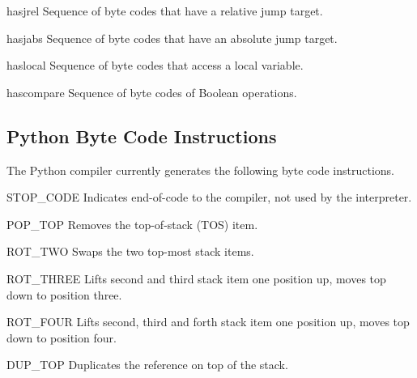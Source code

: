 \begin{datadesc}{hasjrel}
Sequence of byte codes that have a relative jump target.
\end{datadesc}

\begin{datadesc}{hasjabs}
Sequence of byte codes that have an absolute jump target.
\end{datadesc}

\begin{datadesc}{haslocal}
Sequence of byte codes that access a local variable.
\end{datadesc}

\begin{datadesc}{hascompare}
Sequence of byte codes of Boolean operations.
\end{datadesc}

\subsection{Python Byte Code Instructions}
\label{bytecodes}

The Python compiler currently generates the following byte code
instructions.


\begin{opcodedesc}{STOP_CODE}{}
Indicates end-of-code to the compiler, not used by the interpreter.
\end{opcodedesc}

\begin{opcodedesc}{POP_TOP}{}
Removes the top-of-stack (TOS) item.
\end{opcodedesc}

\begin{opcodedesc}{ROT_TWO}{}
Swaps the two top-most stack items.
\end{opcodedesc}

\begin{opcodedesc}{ROT_THREE}{}
Lifts second and third stack item one position up, moves top down
to position three.
\end{opcodedesc}

\begin{opcodedesc}{ROT_FOUR}{}
Lifts second, third and forth stack item one position up, moves top down to
position four.
\end{opcodedesc}

\begin{opcodedesc}{DUP_TOP}{}
Duplicates the reference on top of the stack.
\end{opcodedesc}

